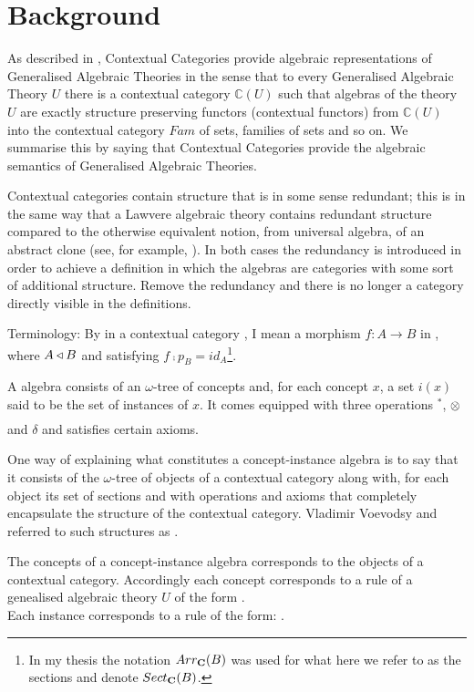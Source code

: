 \documentclass[10pt,a4paper]{article}
\begin{document}
\section{Background}
As described in \cite{Cartmell86}, Contextual Categories provide algebraic representations of Generalised Algebraic Theories  in the sense that to every Generalised Algebraic Theory $U$ there is a contextual category $\mathbb{C}(U)$ such that algebras of the theory $U$ are exactly structure preserving functors (contextual functors)  from $\mathbb{C}(U)$ into the contextual category $Fam$ of sets, families of sets and so on. We summarise this by saying that Contextual Categories provide the algebraic semantics of Generalised Algebraic Theories. 

\noindent
Contextual categories contain structure that is in some sense redundant; this is in the same way that a Lawvere algebraic theory contains redundant structure compared to the otherwise equivalent notion, from universal algebra, of an abstract clone (see, for example, \cite{KerkoffonClones}). In both cases the redundancy is introduced in order to achieve a definition in which the algebras are categories with some sort of additional structure. Remove the redundancy and there is no longer a category directly visible in the definitions.

Terminology: By 
 in a contextual category \catc, I mean a morphism $f:A\rightarrow B$ in \catc, where 
$A \triangleleft B$ and satisfying  $f \comp p_B = id_A$\footnote{In my thesis the notation $Arr_{\textbf{C}}(B)$ was used for what here we refer to as the sections and denote $Sect_{\textbf{C}}(B)$.}.


  
A  algebra consists of an $\omega$-tree of concepts and, 
for each concept $x$, a set $i(x)$
said to be the set of instances of $x$.
It comes equipped with three operations $^*$, $\underset{}{\otimes}$ and $\delta$ and   
satisfies certain axioms.

\noindent
One way of explaining what constitutes a concept-instance algebra 
is to say that it consists of the $\omega$-tree of objects of a contextual category along with, 
for each object its set of sections  and with operations and axioms that completely encapsulate the structure of the contextual category. Vladimir Voevodsy and referred to such structures as .

The concepts of a concept-instance algebra corresponds to the objects of a contextual category. 
Accordingly  each concept corresponds to  a rule of a genealised algebraic theory $U$ of the form
. \\
Each instance corresponds to a rule of the form:
 .
\end{document}
